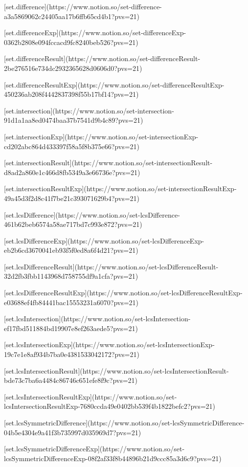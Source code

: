 [set.difference](https://www.notion.so/set-difference-a3a5869062c24405aa17b6ffb65cd4b1?pvs=21)

[set.differenceExp](https://www.notion.so/set-differenceExp-0362b2808e094fccacd9fc8240beb526?pvs=21)

[set.differenceResult](https://www.notion.so/set-differenceResult-2be276516e734dc2932365628d0606d0?pvs=21)

[set.differenceResultExp](https://www.notion.so/set-differenceResultExp-450236ab208f4442837398f55b17bf14?pvs=21)

[set.intersection](https://www.notion.so/set-intersection-91d1a1aa8ed0474baa37b7541d9b4c89?pvs=21)

[set.intersectionExp](https://www.notion.so/set-intersectionExp-cd202abc864d433397f58a5f8b375e66?pvs=21)

[set.intersectionResult](https://www.notion.so/set-intersectionResult-d8ad2a860e1c466d8fb5349a3e66736e?pvs=21)

[set.intersectionResultExp](https://www.notion.so/set-intersectionResultExp-49a45d3f2d8c41f7be21c393071629b4?pvs=21)

[set.lcsDifference](https://www.notion.so/set-lcsDifference-461b62beb6574a58ae717bd7c993e872?pvs=21)

[set.lcsDifferenceExp](https://www.notion.so/set-lcsDifferenceExp-eb2b6cd3670041eb93f5f0ed8a6f4d21?pvs=21)

[set.lcsDifferenceResult](https://www.notion.so/set-lcsDifferenceResult-32d2fb3fbb1143968d758755df9a1cfa?pvs=21)

[set.lcsDifferenceResultExp](https://www.notion.so/set-lcsDifferenceResultExp-e03688ef4fb84441bac15553231a6070?pvs=21)

[set.lcsIntersection](https://www.notion.so/set-lcsIntersection-ef17fbd511884bd19907e8ef263aede5?pvs=21)

[set.lcsIntersectionExp](https://www.notion.so/set-lcsIntersectionExp-19c7e1e8af934b7ba0e4381533042172?pvs=21)

[set.lcsIntersectionResult](https://www.notion.so/set-lcsIntersectionResult-bde73c7ba6a4484c86746c651efe8f9c?pvs=21)

[set.lcsIntersectionResultExp](https://www.notion.so/set-lcsIntersectionResultExp-7680ccda49e0402bb539f4b1822befc2?pvs=21)

[set.lcsSymmetricDifference](https://www.notion.so/set-lcsSymmetricDifference-04b5e4304e9a41f3b735997d035969d7?pvs=21)

[set.lcsSymmetricDifferenceExp](https://www.notion.so/set-lcsSymmetricDifferenceExp-08f2af33f8b44896b21d9ccc85a3d6c9?pvs=21)

